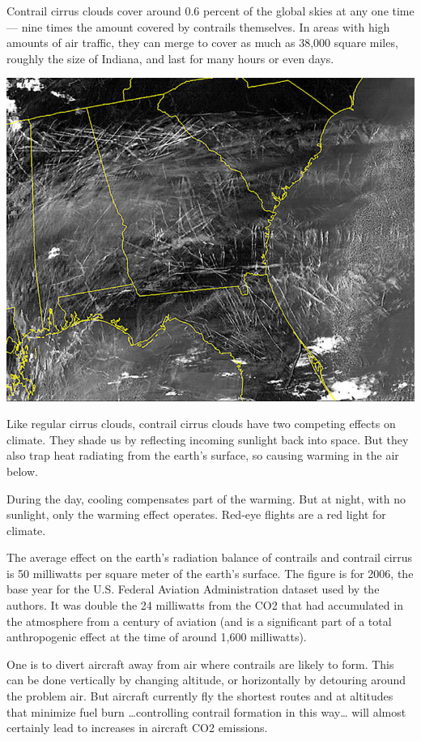 \documentclass[
]{book}
\begin{document}
Contrail cirrus clouds cover around 0.6 percent of the global skies at any one time --- nine times the amount covered by contrails themselves. In areas with high amounts of air traffic, they can merge to cover as much as 38,000 square miles, roughly the size of Indiana, and last for many hours or even days.

\includegraphics{fig/contrails.jpg}

Like regular cirrus clouds, contrail cirrus clouds have two competing effects on climate. They shade us by reflecting incoming sunlight back into space. But they also trap heat radiating from the earth's surface, so causing warming in the air below.

During the day, cooling compensates part of the warming. But at night, with no sunlight, only the warming effect operates. Red-eye flights are a red light for climate.

The average effect on the earth's radiation balance of contrails and contrail cirrus is 50 milliwatts per square meter of the earth's surface.
The figure is for 2006, the base year for the U.S. Federal Aviation Administration dataset used by the authors. It was double the 24 milliwatts from the CO2 that had accumulated in the atmosphere from a century of aviation (and is a significant part of a total anthropogenic effect at the time of around 1,600 milliwatts).

One is to divert aircraft away from air where contrails are likely to form. This can be done vertically by changing altitude, or horizontally by detouring around the problem air. But aircraft currently fly the shortest routes and at altitudes that minimize fuel burn \ldots controlling contrail formation in this way\ldots{} will almost certainly lead to increases in aircraft CO2 emissions.
\end{document}
